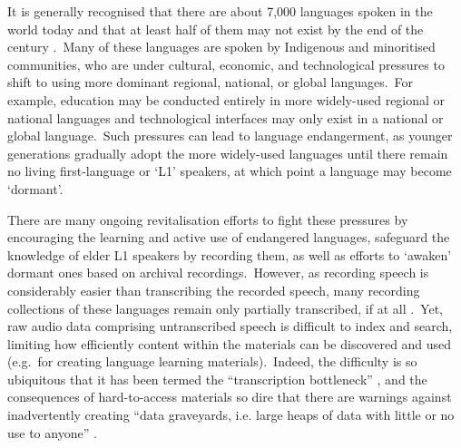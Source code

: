 \documentclass[main.tex]{subfiles}
\begin{document}
It is generally recognised that there are about 7,000 languages spoken in the world today and that at least half of them may not exist by the end of the century \parencite{austin2011cambridge}.~Many of these languages are spoken by Indigenous and minoritised communities, who are under cultural, economic, and technological pressures to shift to using more dominant regional, national, or global languages.~For example, education may be conducted entirely in more widely-used regional or national languages and technological interfaces may only exist in a national or global language.~Such pressures can lead to language endangerment, as younger generations gradually adopt the more widely-used languages until there remain no living first-language or `L1' speakers, at which point a language may become `dormant'.

There are many ongoing revitalisation efforts to fight these pressures by encouraging the learning and active use of endangered languages, safeguard the knowledge of elder L1 speakers by recording them, as well as efforts to ‘awaken’ dormant ones based on archival recordings.~However, as recording speech is considerably easier than transcribing the recorded speech, many recording collections of these languages remain only partially transcribed, if at all \parencite{cox2019taking}.~Yet, raw audio data comprising untranscribed speech is difficult to index and search, limiting how efficiently content within the materials can be discovered and used (e.g.~for creating language learning materials).~Indeed, the difficulty is so ubiquitous that it has been termed the ``transcription bottleneck'' \parencite[]{seifart2018language,foley2018building,cox2019taking}, and the consequences of hard-to-access materials so dire that there are warnings against inadvertently creating ``data graveyards, i.e. large heaps of data with little or no use to anyone'' \parencite[][p. 4]{himmelmann2006language}.
\end{document}
